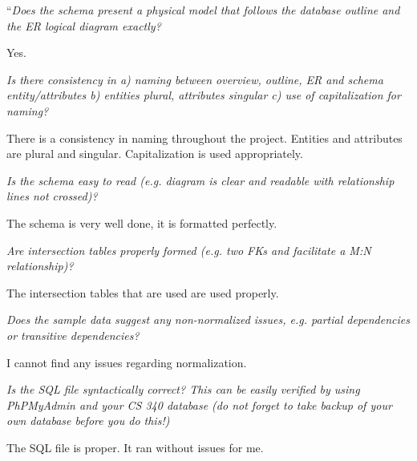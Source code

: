\documentclass{article}
\begin{document}
\vspace{0.5cm}
\begin{tcolorbox}[colback=secondarycolor, colframe=primarycolor, title=\textbf{Step 2: Peer Review 3 - Tyler Grzymalski}]
``\textit{Does the schema present a physical model that follows the database outline and the ER logical diagram exactly?}

\vspace{0.05cm}
Yes.  

\vspace{0.2cm}
\textit{Is there consistency in a) naming between overview, outline, ER and schema entity/attributes b) entities plural, attributes singular c) use of capitalization for naming?}

\vspace{0.05cm}
There is a consistency in naming throughout the project. Entities and attributes are plural and singular. Capitalization is used appropriately.

\vspace{0.2cm}
\textit{Is the schema easy to read (e.g. diagram is clear and readable with relationship lines not crossed)?}

\vspace{0.05cm}
The schema is very well done, it is formatted perfectly.

\vspace{0.2cm}
\textit{Are intersection tables properly formed (e.g. two FKs and facilitate a M:N relationship)?}

\vspace{0.05cm}
The intersection tables that are used are used properly. 

\vspace{0.2cm}
\textit{Does the sample data suggest any non-normalized issues, e.g. partial dependencies or transitive dependencies?}

\vspace{0.05cm}
I cannot find any issues regarding normalization. 

\vspace{0.2cm}
\textit{Is the SQL file syntactically correct? This can be easily verified by using PhPMyAdmin and your CS 340 database (do not forget to take backup of your own database before you do this!)}

\vspace{0.05cm}
The SQL file is proper. It ran without issues for me.


\end{tcolorbox}
\end{document}
